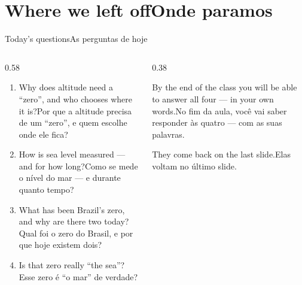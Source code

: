 \documentclass[aspectratio=169,11pt]{beamer}
\newcommand{\tr}[2]{\ifEN#2\else#1\fi}
\begin{document}
\section{\tr{Onde paramos}{Where we left off}}

\begin{frame}{\tr{As perguntas de hoje}{Today's questions}}
  \begin{columns}[T]
    \begin{column}{0.58\textwidth}
      \begin{enumerate}
        \setlength{\itemsep}{8pt}
        \item \tr{Por que a altitude precisa de um ``zero'', e quem escolhe onde ele fica?}{Why
              does altitude need a ``zero'', and who chooses where it is?}
        \item \tr{Como se mede o nível do mar --- e durante quanto tempo?}{How is sea level
              measured --- and for how long?}
        \item \tr{Qual foi o zero do Brasil, e por que hoje existem dois?}{What has been
              Brazil's zero, and why are there two today?}
        \item \tr{Esse zero é ``o mar'' de verdade?}{Is that zero really ``the sea''?}
      \end{enumerate}
    \end{column}
    \begin{column}{0.38\textwidth}
      \begin{ideia}[title={\tr{Combinado}{Deal}}]
        \tr{No fim da aula, você vai saber responder às quatro --- com as suas
        palavras.}{By the end of the class you will be able to answer all four --- in your own
        words.}
        \medskip

        \tr{Elas voltam no último slide.}{They come back on the last slide.}
      \end{ideia}
    \end{column}
  \end{columns}
\end{frame}
\end{document}

